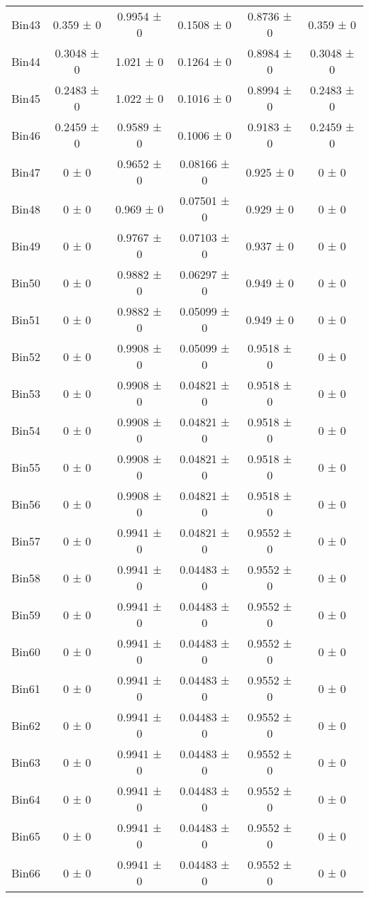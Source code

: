 \begin{tabular}{@{\extracolsep{4pt}}lccccc@{}}
     Bin43 & 0.359 ± 0 & 0.9954 ± 0 & 0.1508 ± 0 & 0.8736 ± 0 & 0.359 ± 0 \\ 
     Bin44 & 0.3048 ± 0 & 1.021 ± 0 & 0.1264 ± 0 & 0.8984 ± 0 & 0.3048 ± 0 \\ 
     Bin45 & 0.2483 ± 0 & 1.022 ± 0 & 0.1016 ± 0 & 0.8994 ± 0 & 0.2483 ± 0 \\ 
     Bin46 & 0.2459 ± 0 & 0.9589 ± 0 & 0.1006 ± 0 & 0.9183 ± 0 & 0.2459 ± 0 \\ 
     Bin47 & 0 ± 0 & 0.9652 ± 0 & 0.08166 ± 0 & 0.925 ± 0 & 0 ± 0 \\ 
     Bin48 & 0 ± 0 & 0.969 ± 0 & 0.07501 ± 0 & 0.929 ± 0 & 0 ± 0 \\ 
     Bin49 & 0 ± 0 & 0.9767 ± 0 & 0.07103 ± 0 & 0.937 ± 0 & 0 ± 0 \\ 
     Bin50 & 0 ± 0 & 0.9882 ± 0 & 0.06297 ± 0 & 0.949 ± 0 & 0 ± 0 \\ 
     Bin51 & 0 ± 0 & 0.9882 ± 0 & 0.05099 ± 0 & 0.949 ± 0 & 0 ± 0 \\ 
     Bin52 & 0 ± 0 & 0.9908 ± 0 & 0.05099 ± 0 & 0.9518 ± 0 & 0 ± 0 \\ 
     Bin53 & 0 ± 0 & 0.9908 ± 0 & 0.04821 ± 0 & 0.9518 ± 0 & 0 ± 0 \\ 
     Bin54 & 0 ± 0 & 0.9908 ± 0 & 0.04821 ± 0 & 0.9518 ± 0 & 0 ± 0 \\ 
     Bin55 & 0 ± 0 & 0.9908 ± 0 & 0.04821 ± 0 & 0.9518 ± 0 & 0 ± 0 \\ 
     Bin56 & 0 ± 0 & 0.9908 ± 0 & 0.04821 ± 0 & 0.9518 ± 0 & 0 ± 0 \\ 
     Bin57 & 0 ± 0 & 0.9941 ± 0 & 0.04821 ± 0 & 0.9552 ± 0 & 0 ± 0 \\ 
     Bin58 & 0 ± 0 & 0.9941 ± 0 & 0.04483 ± 0 & 0.9552 ± 0 & 0 ± 0 \\ 
     Bin59 & 0 ± 0 & 0.9941 ± 0 & 0.04483 ± 0 & 0.9552 ± 0 & 0 ± 0 \\ 
     Bin60 & 0 ± 0 & 0.9941 ± 0 & 0.04483 ± 0 & 0.9552 ± 0 & 0 ± 0 \\ 
     Bin61 & 0 ± 0 & 0.9941 ± 0 & 0.04483 ± 0 & 0.9552 ± 0 & 0 ± 0 \\ 
     Bin62 & 0 ± 0 & 0.9941 ± 0 & 0.04483 ± 0 & 0.9552 ± 0 & 0 ± 0 \\ 
     Bin63 & 0 ± 0 & 0.9941 ± 0 & 0.04483 ± 0 & 0.9552 ± 0 & 0 ± 0 \\ 
     Bin64 & 0 ± 0 & 0.9941 ± 0 & 0.04483 ± 0 & 0.9552 ± 0 & 0 ± 0 \\ 
     Bin65 & 0 ± 0 & 0.9941 ± 0 & 0.04483 ± 0 & 0.9552 ± 0 & 0 ± 0 \\ 
     Bin66 & 0 ± 0 & 0.9941 ± 0 & 0.04483 ± 0 & 0.9552 ± 0 & 0 ± 0 \\ 

\end{tabular}
